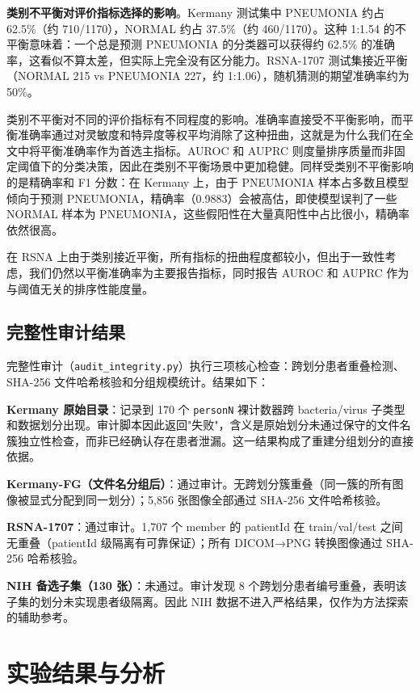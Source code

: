 \documentclass[12pt,a4paper,UTF8,openany]{ctexbook}
\begin{document}
\textbf{类别不平衡对评价指标选择的影响}。Kermany 测试集中 PNEUMONIA 约占 62.5\%（约 710/1170），NORMAL 约占 37.5\%（约 460/1170）。这种 1:1.54 的不平衡意味着：一个总是预测 PNEUMONIA 的分类器可以获得约 62.5\% 的准确率，这看似不算太差，但实际上完全没有区分能力。RSNA-1707 测试集接近平衡（NORMAL 215 vs PNEUMONIA 227，约 1:1.06），随机猜测的期望准确率约为 50\%。

类别不平衡对不同的评价指标有不同程度的影响。准确率直接受不平衡影响，而平衡准确率通过对灵敏度和特异度等权平均消除了这种扭曲，这就是为什么我们在全文中将平衡准确率作为首选主指标。AUROC 和 AUPRC 则度量排序质量而非固定阈值下的分类决策，因此在类别不平衡场景中更加稳健。同样受类别不平衡影响的是精确率和 F1 分数：在 Kermany 上，由于 PNEUMONIA 样本占多数且模型倾向于预测 PNEUMONIA，精确率（0.9883）会被高估，即使模型误判了一些 NORMAL 样本为 PNEUMONIA，这些假阳性在大量真阳性中占比很小，精确率依然很高。

在 RSNA 上由于类别接近平衡，所有指标的扭曲程度都较小，但出于一致性考虑，我们仍然以平衡准确率为主要报告指标，同时报告 AUROC 和 AUPRC 作为与阈值无关的排序性能度量。

\subsection{完整性审计结果}

完整性审计（\texttt{audit\_integrity.py}）执行三项核心检查：跨划分患者重叠检测、SHA-256 文件哈希核验和分组规模统计。结果如下：

\textbf{Kermany 原始目录}：记录到 170 个 \texttt{personN} 裸计数器跨 bacteria/virus 子类型和数据划分出现。审计脚本因此返回"失败"，含义是原始划分未通过保守的文件名簇独立性检查，而非已经确认存在患者泄漏。这一结果构成了重建分组划分的直接依据。

\textbf{Kermany-FG（文件名分组后）}：通过审计。无跨划分簇重叠（同一簇的所有图像被显式分配到同一划分）；5,856 张图像全部通过 SHA-256 文件哈希核验。

\textbf{RSNA-1707}：通过审计。1,707 个 member 的 patientId 在 train/val/test 之间无重叠（patientId 级隔离有可靠保证）；所有 DICOM→PNG 转换图像通过 SHA-256 哈希核验。

\textbf{NIH 备选子集（130 张）}：未通过。审计发现 8 个跨划分患者编号重叠，表明该子集的划分未实现患者级隔离。因此 NIH 数据不进入严格结果，仅作为方法探索的辅助参考。

\section{实验结果与分析}
\end{document}
